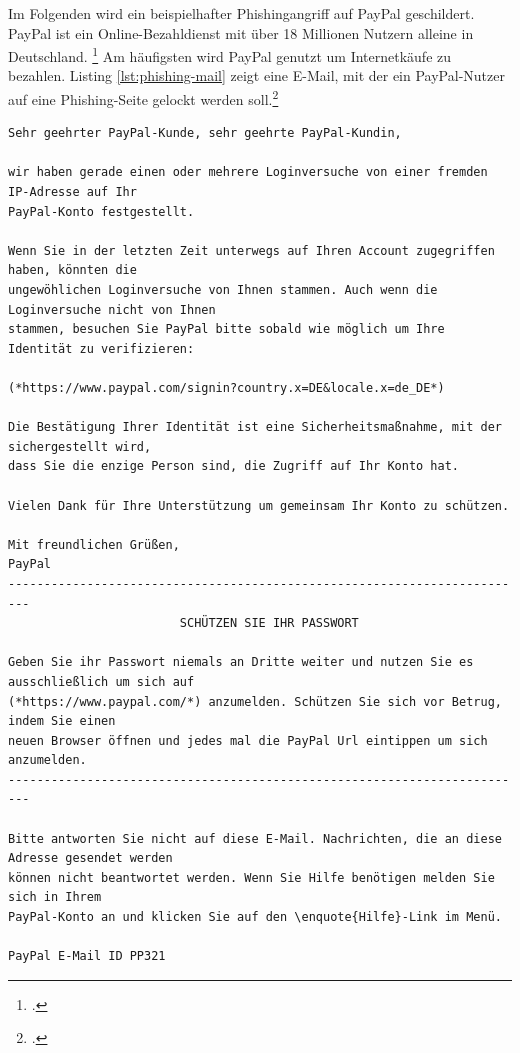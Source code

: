 Im Folgenden wird ein beispielhafter Phishingangriff auf PayPal geschildert. PayPal ist ein Online-Bezahldienst mit über 18 Millionen Nutzern alleine in Deutschland. \footcite[Vgl.][]{paypal} Am häufigsten wird PayPal genutzt um Internetkäufe zu bezahlen. Listing \ref{lst:phishing-mail} zeigt eine E-Mail, mit der ein PayPal-Nutzer auf eine Phishing-Seite gelockt werden soll.\footcite[Vgl.][10]{phishing}

\begin{scriptsize}
\begin{lstlisting}
Sehr geehrter PayPal-Kunde, sehr geehrte PayPal-Kundin,

wir haben gerade einen oder mehrere Loginversuche von einer fremden IP-Adresse auf Ihr
PayPal-Konto festgestellt.

Wenn Sie in der letzten Zeit unterwegs auf Ihren Account zugegriffen haben, könnten die
ungewöhlichen Loginversuche von Ihnen stammen. Auch wenn die Loginversuche nicht von Ihnen
stammen, besuchen Sie PayPal bitte sobald wie möglich um Ihre Identität zu verifizieren:

(*https://www.paypal.com/signin?country.x=DE&locale.x=de_DE*)

Die Bestätigung Ihrer Identität ist eine Sicherheitsmaßnahme, mit der sichergestellt wird,
dass Sie die enzige Person sind, die Zugriff auf Ihr Konto hat.

Vielen Dank für Ihre Unterstützung um gemeinsam Ihr Konto zu schützen.

Mit freundlichen Grüßen,
PayPal
-------------------------------------------------------------------------
                        SCHÜTZEN SIE IHR PASSWORT

Geben Sie ihr Passwort niemals an Dritte weiter und nutzen Sie es ausschließlich um sich auf
(*https://www.paypal.com/*) anzumelden. Schützen Sie sich vor Betrug, indem Sie einen
neuen Browser öffnen und jedes mal die PayPal Url eintippen um sich anzumelden.
-------------------------------------------------------------------------

Bitte antworten Sie nicht auf diese E-Mail. Nachrichten, die an diese Adresse gesendet werden
können nicht beantwortet werden. Wenn Sie Hilfe benötigen melden Sie sich in Ihrem
PayPal-Konto an und klicken Sie auf den \enquote{Hilfe}-Link im Menü.

PayPal E-Mail ID PP321
\end{lstlisting}
\end{scriptsize}

